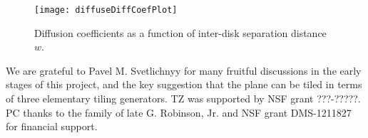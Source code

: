 \documentclass[aps,pre,showpacs,preprint,groupedaddress,floatfix]{revtex4-1}
\begin{document}
\begin{figure}
  \texttt{[image: diffuseDiffCoefPlot]}
  \caption[]{\label{fig-results} Diffusion coefficients as a function
    of inter-disk separation distance $w$.}
\end{figure}



\begin{acknowledgments}
We are grateful to Pavel M. Svetlichnyy for many fruitful discussions in
the early stages of this project, and the key suggestion that the plane
can be tiled in terms of three elementary tiling generators.
TZ was supported by NSF grant ???-?????.
PC thanks to the family of late G. Robinson, Jr. and NSF grant
DMS-1211827 for financial support.
\end{acknowledgments}


% 


\ifboyscout
\newpage 
\end{document}
